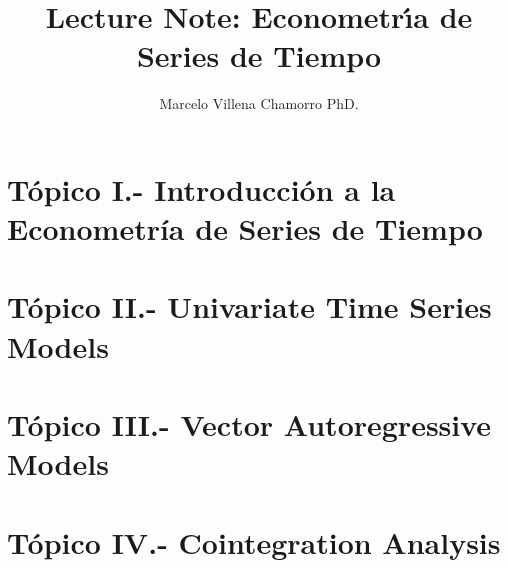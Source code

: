\documentclass{easyclass}
\begin{document}
\begin{titlepage}
    \title{Lecture Note: Econometr\'\i{}a de Series de Tiempo }
    \author{Marcelo Villena Chamorro PhD.}
    \maketitle
\end{titlepage}

\tableofcontents

\chapter{Tópico I.- Introducción a la Econometría de Series de Tiempo}

\chapter{Tópico II.- Univariate Time Series Models}

\chapter{Tópico III.- Vector Autoregressive Models}

\chapter{Tópico IV.- Cointegration Analysis}



\end{document}
